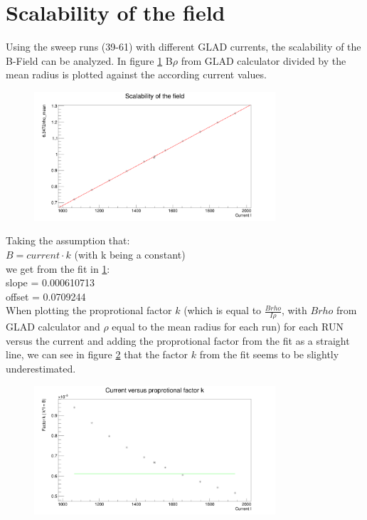 \documentclass[12pt, letterpaper]{article}
\begin{document}
\section{Scalability of the field}
Using the sweep runs (39-61) with different GLAD currents, the scalability of the B-Field can be analyzed. In figure \ref{fig:scalar} B\textunderscore$\rho$  from GLAD calculator divided by the mean radius is plotted against the according current values.\\ 
 \begin{figure}[!htb]
	\includegraphics[width=0.8\textwidth]{scalar.png}
	\caption{\label{fig:scalar}}
	\label{fig:scalar}
\end{figure}
Taking the assumption that:\\
$B = current \cdot k $ (with k being a constant)\\
we get from the fit in \ref{fig:scalar}:\\
slope = 0.000610713 \\
offset = 0.0709244\\
When plotting the proprotional factor $k$ (which is equal to $\frac{Brho}{I\rho}$, with $Brho$ from GLAD calculator and $\rho$ equal to the mean radius for each run) for each RUN versus the current and adding the proprotional factor from the fit as a straight line, we can see in figure \ref{fig:factor_k} that the factor $k$ from the fit seems to be slightly underestimated. \\
\begin{figure}[!htb]
	\includegraphics[width=0.8\textwidth]{curent_vs_k_factor.png}
	\caption{\label{fig:factor_k}}
	\label{fig:factor_k}
\end{figure}
\newpage
\end{document}
